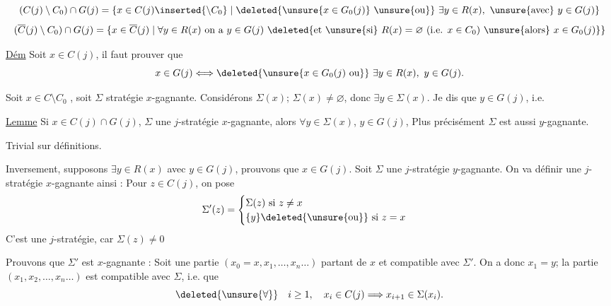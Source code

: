 \[
(C(j)\setminus C_0)\cap G(j)=\{x\in C(j)\inserted{\setminus C_0}\mid\deleted{\unsure{x\in G_0(j)}\ \unsure{\text{ou}}}\ \exists y\in R(x),\ \unsure{\text{avec}}\ y\in G(j)\}
\]
\[
(\overline C(j)\setminus C_0)\cap G(j)=\{x\in\overline C(j)\mid\forall y\in R(x)\ \text{on a }y\in G(j)\ \deleted{\text{et }\unsure{\text{si}}\ R(x)=\varnothing\ (\text{i.e. }x\in C_0)\ \unsure{\text{alors}}\ x\in G_0(j)}\}
\]

\uline{Dém}  Soit $x\in C(j)$, il faut prouver que
\[
x\in G(j)\Longleftrightarrow\deleted{\unsure{x\in G_0(j)\ \text{ou}}}\ \exists y\in R(x),\ y\in G(j).
\]

Soit $x\in C\setminus C_0$ , soit $\Sigma$ stratégie  $x$-gagnante. Considérons $\Sigma(x)$;   $\Sigma(x)\ne\varnothing$, donc $\exists y\in\Sigma(x)$. Je dis que $y\in G(j)$, i.e.

\uline{Lemme} Si $x\in C(j)\cap G(j)$, $\Sigma$ une $j$-stratégie $x$-gagnante, alors $\forall y\in\Sigma(x)$,  $y\in G(j)$,  Plus précisément $\Sigma$ est aussi $y$-gagnante.

Trivial sur définitions.

Inversement, supposons $\exists y\in R(x)$ avec $y\in G(j)$, prouvons que $x\in G(j)$. Soit $\Sigma$ une $j$-stratégie $y$-gagnante. On va  définir une $j$-stratégie  $x$-gagnante ainsi : Pour $z\in C(j)$, on pose
\[
\Sigma'(z)=\begin{cases}\Sigma(z)\text{ si }z\ne x\\ \{y\}\deleted{\unsure{\text{ou}}}\text{ si }z=x\end{cases}
\]
C'est une $j$-stratégie, car  $\Sigma(z)\ne0$  

Prouvons que $\Sigma'$ est $x$-gagnante : Soit une partie $(x_0=x,x_1,\ldots,x_n\ldots)$ partant de $x$ et compatible avec $\Sigma'$. On a donc $x_1=y$;  la partie $(x_1,x_2,\ldots,x_n\ldots)$  est compatible avec $\Sigma$, i.e. que
\[
\deleted{\unsure{\forall}}\quad i\geq1,\quad x_i\in C(j)\Longrightarrow x_{i+1}\in\Sigma(x_i).
\]
